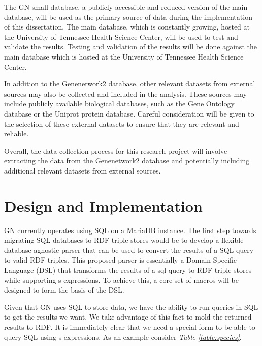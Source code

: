 The GN small database, a publicly accessible and reduced version of the main database, will be used as the primary source of data during the implementation of this dissertation.  The main database, which is constantly growing, hosted at the University of Tennessee Health Science Center, will be used to test and validate the results.  Testing and validation of the results will be done against the main database which is hosted at the University of Tennessee Health Science Center.

In addition to the Genenetwork2 database, other relevant datasets from external sources may also be collected and included in the analysis.  These sources may include publicly available biological databases, such as the Gene Ontology database or the Uniprot protein database.  Careful consideration will be given to the selection of these external datasets to ensure that they are relevant and reliable.

Overall, the data collection process for this research project will involve extracting the data from the Genenetwork2 database and potentially including additional relevant datasets from external sources.

\section{Design and Implementation}

GN currently operates using SQL on a MariaDB instance.  The first step towards migrating SQL databases to RDF triple stores would be to develop a flexible database-agnostic parser that can be used to convert the results of a SQL query to valid RDF triples.  This proposed parser is essentially a Domain Specific Language (DSL) that transforms the results of a sql query to RDF triple stores while supporting s-expressions.  To achieve this, a core set of macros will be designed to form the basis of the DSL.

Given that GN uses SQL to store data, we have the ability to run queries in SQL to get the results we want.  We take advantage of this fact to mold the returned results to RDF.  It is immediately clear that we need a special form to be able to query SQL using s-expressions.  As an example consider \textit{Table \ref{table:species}}.

